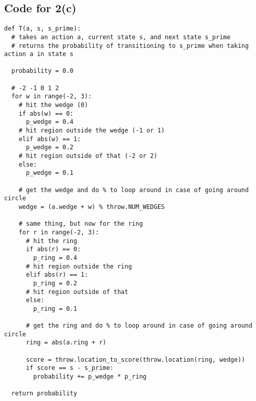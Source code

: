 \documentclass{article}
\begin{document}
\subsection*{Code for 2(c)}
\begin{verbatim}
def T(a, s, s_prime):
  # takes an action a, current state s, and next state s_prime
  # returns the probability of transitioning to s_prime when taking action a in state s
  
  probability = 0.0

  # -2 -1 0 1 2
  for w in range(-2, 3):
    # hit the wedge (0)
    if abs(w) == 0:
      p_wedge = 0.4
    # hit region outside the wedge (-1 or 1)
    elif abs(w) == 1:
      p_wedge = 0.2
    # hit region outside of that (-2 or 2)
    else:
      p_wedge = 0.1

    # get the wedge and do % to loop around in case of going around circle
    wedge = (a.wedge + w) % throw.NUM_WEDGES

    # same thing, but now for the ring
    for r in range(-2, 3):
      # hit the ring
      if abs(r) == 0:
        p_ring = 0.4
      # hit region outside the ring
      elif abs(r) == 1:
        p_ring = 0.2
      # hit region outside of that
      else:
        p_ring = 0.1

      # get the ring and do % to loop around in case of going around circle
      ring = abs(a.ring + r)

      score = throw.location_to_score(throw.location(ring, wedge))
      if score == s - s_prime:
        probability += p_wedge * p_ring

  return probability
\end{verbatim}
\end{document}
